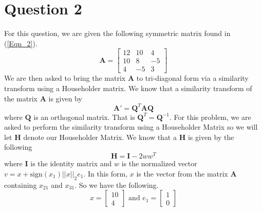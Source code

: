 \documentclass{article}
\begin{document}
\section{Question 2}
For this question, we are given the following symmetric matrix found in (\ref{Eqn_2}).
\begin{equation}
    \label{Eqn_2}
    \mathbf{A} = \begin{bmatrix}
        12 & 10 & 4 \\
        10 & 8 & -5 \\
        4 & -5 & 3
    \end{bmatrix}
\end{equation}
We are then asked to bring the matrix \(\mathbf{A}\) to tri-diagonal form via a similarity transform using a Householder matrix. We know that a similarity transform of the matrix \(\mathbf{A}\) is given by
\[
\mathbf{A}' = \mathbf{Q}^T\mathbf{AQ}
\]
where \(\mathbf{Q}\) is an orthogonal matrix. That is \(\mathbf{Q}^T = \mathbf{Q}^{-1}\).
For this problem, we are asked to perform the similarity transform using a Householder Matrix so we will let \(\mathbf{H}\) denote our Householder Matrix. We know that a \(\mathbf{H}\) is given by the following
\[
\mathbf{H} = \mathbf{I} - 2ww^T
\]
where \(\mathbf{I}\) is the identity matrix and \(w\) is the normalized vector \(v = x+\mbox{sign}(x_1)||x||_2e_1\). In this form, \(x\) is the vector from the matrix \(\mathbf{A}\) containing \(x_{21}\) and \(x_{31}\). So we have the following.
\[
x = \begin{bmatrix}
    10 \\
    4
\end{bmatrix} \mbox{ and } e_1 = \begin{bmatrix}
    1 \\
    0
\end{bmatrix}
\]
\end{document}
